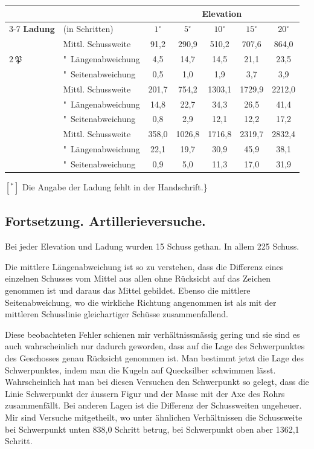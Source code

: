 \documentclass[12pt,a4paper]{article}
\begin{document}
\begin{center}
\begin{tabular}{llccccc}
\toprule
& & \multicolumn{5}{c}{\textbf{Elevation}} \\
\cmidrule{3-7}
\textbf{Ladung} & (in Schritten) & $1^\circ$ & $5^\circ$ & $10^\circ$ & $15^\circ$ & $20^\circ$ \\
\midrule
\multirow{3}{*}{$2\ \mathfrak{P}$} & Mittl. Schussweite & 91,2 & 290,9 & 510,2 & 707,6 & 864,0 \\
& "\ L\"angenabweichung & 4,5 & 14,7 & 14,5 & 21,1 & 23,5 \\
& "\ Seitenabweichung & 0,5 & 1,0 & 1,9 & 3,7 & 3,9 \\
\addlinespace
\multirow{3}{*}{$5\ \mathfrak{P}$} & Mittl. Schussweite & 201,7 & 754,2 & 1303,1 & 1729,9 & 2212,0 \\
& "\ L\"angenabweichung & 14,8 & 22,7 & 34,3 & 26,5 & 41,4 \\
& "\ Seitenabweichung & 0,8 & 2,9 & 12,1 & 12,2 & 17,2 \\
\addlinespace
\multirow{3}{*}{$[{}^*]$} & Mittl. Schussweite & 358,0 & 1026,8 & 1716,8 & 2319,7 & 2832,4 \\
& "\ L\"angenabweichung & 22,1 & 19,7 & 30,9 & 45,9 & 38,1 \\
& "\ Seitenabweichung & 0,9 & 5,0 & 11,3 & 17,0 & 31,9 \\
\bottomrule
\end{tabular}
\end{center}

\smallskip\noindent
$[{}^*]$ Die Angabe der Ladung fehlt in der Handschrift.\}


\subsection*{Fortsetzung. Artillerieversuche.}

Bei jeder Elevation und Ladung wurden 15 Schuss gethan. In allem 225 Schuss.

Die mittlere L\"angenabweichung ist so zu verstehen, dass die Differenz eines einzelnen Schusses vom Mittel aus allen ohne R\"ucksicht auf das Zeichen genommen ist und daraus das Mittel gebildet. Ebenso die mittlere Seitenabweichung, wo die wirkliche Richtung angenommen ist als mit der mittleren Schusslinie gleichartiger Sch\"usse zusammenfallend.

Diese beobachteten Fehler schienen mir verh\"altnissm\"assig gering und sie sind es auch wahrscheinlich nur dadurch geworden, dass auf die Lage des Schwerpunktes des Geschosses genau R\"ucksicht genommen ist. Man bestimmt jetzt die Lage des Schwerpunktes, indem man die Kugeln auf Quecksilber schwimmen l\"asst. Wahrscheinlich hat man bei diesen Versuchen den Schwerpunkt so gelegt, dass die Linie Schwerpunkt der \"aussern Figur und der Masse mit der Axe des Rohrs zusammenf\"allt. Bei anderen Lagen ist die Differenz der Schussweiten ungeheuer. Mir sind Versuche mitgetheilt, wo unter \"ahnlichen Verh\"altnissen die Schussweite bei Schwerpunkt unten 838,0 Schritt betrug, bei Schwerpunkt oben aber 1362,1 Schritt.
\end{document}
